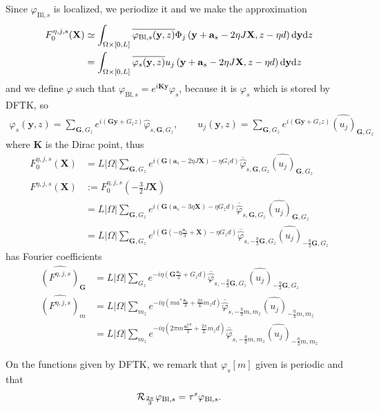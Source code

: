 \documentclass[11pt,a4paper,reqno,french,tikz]{amsart}
\def\d{{\rm d}}
\newcommand{\pa}[1]{\left( #1 \right)} %
\newcommand{\ab}[1]{\left|#1\right|} %
\newcommand\vp{\varphi} %
\newcommand{\f}[2]{\frac{#1}{#2}} %
\def\bX{{\mathbf X}}
\def\bG{{\mathbf G}}
\def\ba{{\mathbf a}}
\def\by{{\mathbf y}}
\def\bK{{\mathbf K}}
\begin{document}
Since $\vp_{\text{Bl},s}$ is localized, we periodize it and we make the approximation
\begin{align*}
	F_0^{\eta,j,s}(\bX) &\simeq \int_{\Omega \times [0,L]} \overline{\vp_{\text{Bl},s}(\by,z)} \Phi_j\pa{\by +\ba_s -2\eta J \bX,z-\eta d} \d \by \d z \\
&=\int_{\Omega \times [0,L]} \overline{\vp_{s}(\by,z)} u_j\pa{\by +\ba_s -2\eta J \bX,z-\eta d} \d \by \d z
\end{align*}
and we define $\vp$ such that $\vp_{\text{Bl},s} = e^{i \bK \by} \vp_s$, because it is $\widehat{\vp_s}$ which is stored by DFTK, so
\begin{align*}
\vp_{s}(\by,z) = \sum_{\bG, G_z} e^{i\pa{\bG \by + G_z z}} \widehat{\vp}_{s,\bG,G_z}, \qquad u_j(\by,z) = \sum_{\bG, G_z} e^{i\pa{\bG \by + G_z z}} \widehat{\pa{u_j}}_{\bG,G_z}
\end{align*}
where $\bK$ is the Dirac point, thus
\begin{align*}
F_0^{\eta,j,s}(\bX) &= L\ab{\Omega}  \sum_{\bG, G_z} e^{i\pa{\bG \pa{\ba_s - 2\eta J \bX} - \eta G_z d}} \overline{\widehat{\vp}}_{s,\bG,G_z} \widehat{\pa{u_j}}_{\bG,G_z} \\
F^{\eta,j,s}\pa{\bX} & := F_0^{\eta,j,s}\pa{-\tfrac{3}{2} J\bX} \\
		     &= L\ab{\Omega} \sum_{\bG, G_z} e^{i\pa{\bG \pa{\ba_s - 3\eta \bX} - \eta G_z d}} \overline{\widehat{\vp}}_{s,\bG,G_z}\widehat{\pa{u_j}}_{\bG,G_z}\\
&= L\ab{\Omega} \sum_{\bG, G_z} e^{i\pa{\bG \pa{-\eta \f{\ba_s}3 + \bX} - \eta G_z d}} \overline{\widehat{\vp}}_{s,-\f{\eta}{3}\bG,G_z} \widehat{\pa{u_j}}_{-\f{\eta}{3} \bG,G_z}
\end{align*}
has Fourier coefficients
\begin{align*}
	\widehat{\pa{F^{\eta,j,s}}}_{\bG} &= L\ab{\Omega} \sum_{G_z} e^{-i \eta \pa{\bG  \f{\ba_s}3 + G_z d}} \overline{\widehat{\vp}}_{s,-\f{\eta}{3}\bG,G_z} \widehat{\pa{u_j}}_{-\f{\eta}{3} \bG,G_z} \\
	\widehat{\pa{F^{\eta,j,s}}}_{m}& = L\ab{\Omega} \sum_{m_z} e^{-i \eta \pa{ma^*  \f{\ba_s}3 + \f{2\pi}{L} m_z d}} \overline{\widehat{\vp}}_{s,-\f{\eta}{3}m,m_z} \widehat{\pa{u_j}}_{-\f{\eta}{3} m,m_z} \\
& = L\ab{\Omega} \sum_{m_z} e^{-i \eta \pa{2\pi m \f{\ba^{\text{red}}_s}3 + \f{2\pi}{L} m_z d}} \overline{\widehat{\vp}}_{s,-\f{\eta}{3}m,m_z} \widehat{\pa{u_j}}_{-\f{\eta}{3} m,m_z}
\end{align*}

On the functions given by DFTK, we remark that $\vp_s[m]$ given is periodic and that 
\begin{align*}
\cR_{\f{2\pi}{3}} \vp_{\text{Bl},s} = \tau^s \vp_{\text{Bl},s}.
\end{align*}
\end{document}
